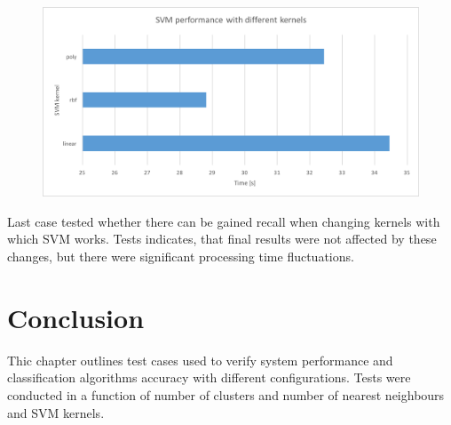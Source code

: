 \begin{figure}[H]
	\begin{center}
		\includegraphics[width=0.9\linewidth]{images/tests/param-svm.png}
		\caption{ }
		\label{param-svm}
	\end{center}
\end{figure}

Last case tested whether there can be gained recall when changing kernels with which SVM works. Tests indicates, that final results were not affected by these changes, but there were significant processing time fluctuations.

\section{Conclusion}
Thic chapter outlines test cases used to verify system performance and classification algorithms accuracy with different configurations. Tests were conducted in a function of number of clusters and number of nearest neighbours and SVM kernels.

